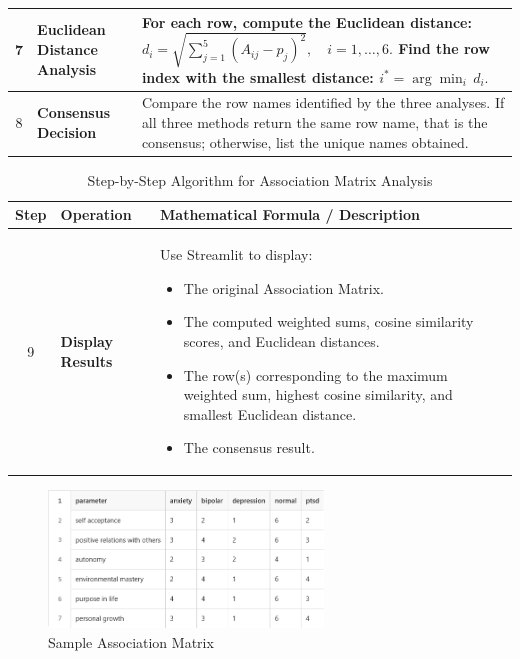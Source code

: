 \begin{table}[H]
\begin{tabularx}{\textwidth}{|c|p{6cm}|>{\raggedright\arraybackslash}X|}
    7 & \textbf{Euclidean Distance Analysis} & For each row, compute the Euclidean distance:
    \( \displaystyle d_i = \sqrt{\sum_{j=1}^{5} \left(A_{ij} - p_j\right)^2}, \quad i=1,\dots,6. \)
    Find the row index with the smallest distance:
    \( \displaystyle i^* = \arg\min_{i}\, d_i. \) \newline \\ \hline
    8 & \textbf{Consensus Decision} & Compare the row names identified by the three analyses. If all three methods return the same row name, that is the consensus; otherwise, list the unique names obtained. \\ \hline
\end{tabularx}
\end{table}

\begin{table}[H]
    \centering
    \caption*{Step-by-Step Algorithm for Association Matrix Analysis}
    \label{tab:algorithm}
    \begin{tabularx}{\textwidth}{|c|p{6cm}|>{\raggedright\arraybackslash}X|}
    \hline
    \textbf{Step} & \textbf{Operation} & \textbf{Mathematical Formula / Description} \\ \hline
    9 & \textbf{Display Results} & Use Streamlit to display:
    \begin{itemize}[noitemsep, topsep=0pt]
        \item The original Association Matrix.
        \item The computed weighted sums, cosine similarity scores, and Euclidean distances.
        \item The row(s) corresponding to the maximum weighted sum, highest cosine similarity, and smallest Euclidean distance.
        \item The consensus result.
    \end{itemize} \\ \hline
    \end{tabularx}
\end{table}

\begin{figure}[h!]  
    \centering
    \includegraphics[width=0.65\textwidth]{App Images/33 Interface.png}  
    \caption*{Sample Association Matrix}
    \label{01i}  %
\end{figure}


